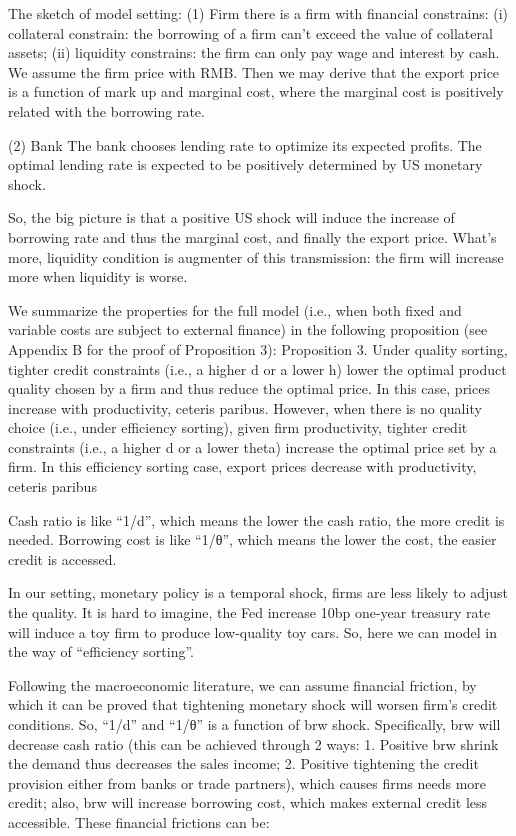 \documentclass[12pt]{article}
\begin{document}
The sketch of model setting:
(1) Firm
there is a firm with financial constrains: (i) collateral constrain: the borrowing of a firm can’t exceed the value of collateral assets; (ii) liquidity constrains: the firm can only pay wage and interest by cash. We assume the firm price with RMB. Then we may derive that the export price is a function of mark up and marginal cost, where the marginal cost is positively related with the borrowing rate. 


(2) Bank
The bank chooses lending rate to optimize its expected profits. The optimal lending rate is expected to be positively determined by US monetary shock.

So, the big picture is that a positive US shock will induce the increase of borrowing rate and thus the marginal cost, and finally the export price. What’s more, liquidity condition is augmenter of this transmission: the firm will increase more when liquidity is worse.

We summarize the properties for the full model (i.e., when both fixed and variable costs are subject to external finance) in the following proposition (see Appendix B for the proof of Proposition 3): 
Proposition 3. Under quality sorting, tighter credit constraints (i.e., a higher d or a lower h) lower the optimal product quality chosen by a firm and thus reduce the optimal price. In this case, prices increase with productivity, ceteris paribus. However, when there is no quality choice (i.e., under efficiency sorting), given firm productivity, tighter credit constraints (i.e., a higher d or a lower theta) increase the optimal price set by a firm. In this efficiency sorting case, export prices decrease with productivity, ceteris paribus


 

Cash ratio is like “1/d”, which means the lower the cash ratio, the more credit is needed.
Borrowing cost is like “1/θ”, which means the lower the cost, the easier credit is accessed.


In our setting, monetary policy is a temporal shock, firms are less likely to adjust the quality. It is hard to imagine, the Fed increase 10bp one-year treasury rate will induce a toy firm to produce low-quality toy cars. So, here we can model in the way of “efficiency sorting”.

Following the macroeconomic literature, we can assume financial friction, by which it can be proved that tightening monetary shock will worsen firm’s credit conditions. So, “1/d” and  “1/θ” is a function of brw shock. Specifically, brw will decrease cash ratio (this can be achieved through 2 ways: 1. Positive brw shrink the demand thus decreases the sales income; 2. Positive tightening the credit provision either from banks or trade partners), which causes firms needs more credit; also, brw will increase borrowing cost, which makes external credit less accessible.  These financial frictions can be:
\end{document}
